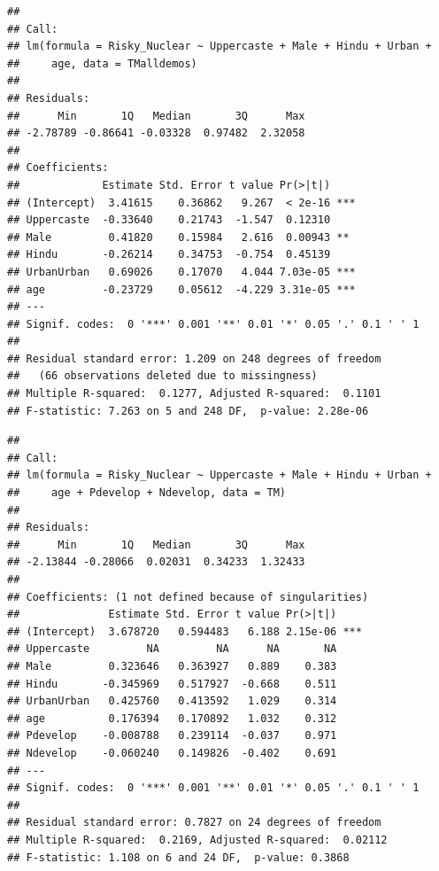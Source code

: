 \documentclass[
]{article}
\begin{document}
\begin{verbatim}
## 
## Call:
## lm(formula = Risky_Nuclear ~ Uppercaste + Male + Hindu + Urban + 
##     age, data = TMalldemos)
## 
## Residuals:
##      Min       1Q   Median       3Q      Max 
## -2.78789 -0.86641 -0.03328  0.97482  2.32058 
## 
## Coefficients:
##             Estimate Std. Error t value Pr(>|t|)    
## (Intercept)  3.41615    0.36862   9.267  < 2e-16 ***
## Uppercaste  -0.33640    0.21743  -1.547  0.12310    
## Male         0.41820    0.15984   2.616  0.00943 ** 
## Hindu       -0.26214    0.34753  -0.754  0.45139    
## UrbanUrban   0.69026    0.17070   4.044 7.03e-05 ***
## age         -0.23729    0.05612  -4.229 3.31e-05 ***
## ---
## Signif. codes:  0 '***' 0.001 '**' 0.01 '*' 0.05 '.' 0.1 ' ' 1
## 
## Residual standard error: 1.209 on 248 degrees of freedom
##   (66 observations deleted due to missingness)
## Multiple R-squared:  0.1277, Adjusted R-squared:  0.1101 
## F-statistic: 7.263 on 5 and 248 DF,  p-value: 2.28e-06
\end{verbatim}

\begin{verbatim}
## 
## Call:
## lm(formula = Risky_Nuclear ~ Uppercaste + Male + Hindu + Urban + 
##     age + Pdevelop + Ndevelop, data = TM)
## 
## Residuals:
##      Min       1Q   Median       3Q      Max 
## -2.13844 -0.28066  0.02031  0.34233  1.32433 
## 
## Coefficients: (1 not defined because of singularities)
##              Estimate Std. Error t value Pr(>|t|)    
## (Intercept)  3.678720   0.594483   6.188 2.15e-06 ***
## Uppercaste         NA         NA      NA       NA    
## Male         0.323646   0.363927   0.889    0.383    
## Hindu       -0.345969   0.517927  -0.668    0.511    
## UrbanUrban   0.425760   0.413592   1.029    0.314    
## age          0.176394   0.170892   1.032    0.312    
## Pdevelop    -0.008788   0.239114  -0.037    0.971    
## Ndevelop    -0.060240   0.149826  -0.402    0.691    
## ---
## Signif. codes:  0 '***' 0.001 '**' 0.01 '*' 0.05 '.' 0.1 ' ' 1
## 
## Residual standard error: 0.7827 on 24 degrees of freedom
## Multiple R-squared:  0.2169, Adjusted R-squared:  0.02112 
## F-statistic: 1.108 on 6 and 24 DF,  p-value: 0.3868
\end{verbatim}
\end{document}
